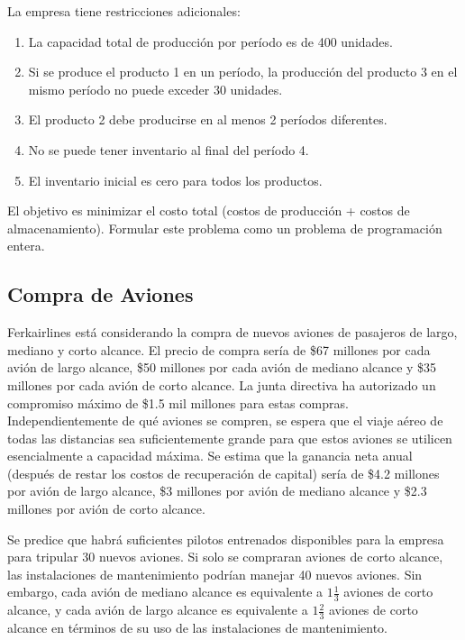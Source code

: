 \documentclass[12pt]{article}
\begin{document}
La empresa tiene restricciones adicionales:
\begin{enumerate}[label=\arabic*.]
    \item La capacidad total de producción por período es de 400 unidades.
    \item Si se produce el producto 1 en un período, la producción del producto 3 en el mismo período no puede exceder 30 unidades.
    \item El producto 2 debe producirse en al menos 2 períodos diferentes.
    \item No se puede tener inventario al final del período 4.
    \item El inventario inicial es cero para todos los productos.
\end{enumerate}

El objetivo es minimizar el costo total (costos de producción + costos de almacenamiento). Formular este problema como un problema de programación entera.

\subsection{Compra de Aviones}
Ferkairlines está considerando la compra de nuevos aviones de pasajeros de largo, mediano y corto alcance. El precio de compra sería de \$67 millones por cada avión de largo alcance, \$50 millones por cada avión de mediano alcance y \$35 millones por cada avión de corto alcance. La junta directiva ha autorizado un compromiso máximo de \$1.5 mil millones para estas compras. Independientemente de qué aviones se compren, se espera que el viaje aéreo de todas las distancias sea suficientemente grande para que estos aviones se utilicen esencialmente a capacidad máxima. Se estima que la ganancia neta anual (después de restar los costos de recuperación de capital) sería de \$4.2 millones por avión de largo alcance, \$3 millones por avión de mediano alcance y \$2.3 millones por avión de corto alcance.

\vspace{0.5em}

Se predice que habrá suficientes pilotos entrenados disponibles para la empresa para tripular 30 nuevos aviones. Si solo se compraran aviones de corto alcance, las instalaciones de mantenimiento podrían manejar 40 nuevos aviones. Sin embargo, cada avión de mediano alcance es equivalente a $1\frac{1}{3}$ aviones de corto alcance, y cada avión de largo alcance es equivalente a $1\frac{2}{3}$ aviones de corto alcance en términos de su uso de las instalaciones de mantenimiento.
\end{document}
